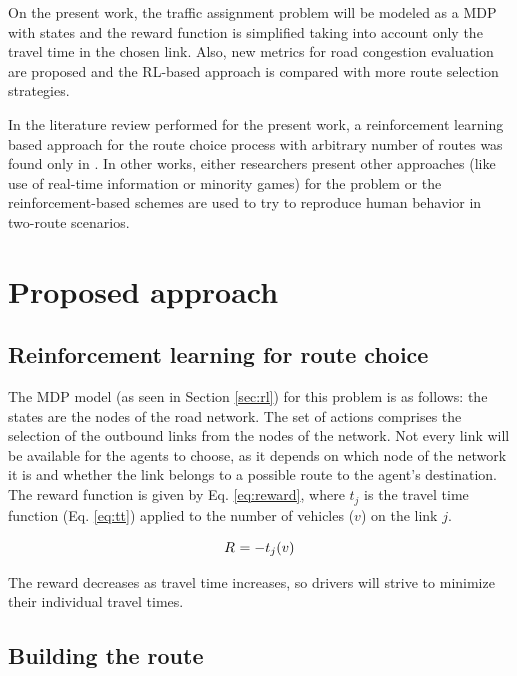 \documentclass{RITA}
\newcommand{\travTime}{\ensuremath{t_j}} 	%
\newcommand{\veh}{\ensuremath{v}}		%
\newcommand{\reward}[1][]{\ensuremath{R_#1}}	%
\begin{document}
On the present work, the traffic assignment problem will be modeled as a MDP with states and the reward function is simplified taking into account only the travel time in the chosen link. Also, new metrics for road congestion evaluation are proposed and the RL-based approach is compared with more route selection strategies. %

In the literature review performed for the present work, a reinforcement learning based approach for the route choice process with arbitrary number of routes was found only in \cite{Tavares&Bazzan2012}. In other works, either researchers present other approaches (like use of real-time information or minority games) for the problem or the reinforcement-based schemes are used to try to reproduce human behavior in two-route scenarios.

\section{Proposed approach}
\label{sec:proposal}

\subsection{Reinforcement learning for route choice}

The MDP model (as seen in Section \ref{sec:rl}) for this problem is as follows: the states are the nodes of the road network. The set of actions comprises the selection of the outbound links from the nodes of the network. Not every link will be available for the agents to choose, as it depends on which node of the network it is and whether the link belongs to a possible route to the agent's destination. The reward function is given by Eq. \eqref{eq:reward}, where $\travTime$ is the travel time function (Eq. \eqref{eq:tt}) applied to the number of vehicles ($\veh$) on the link $j$.

\begin{equation}
\label{eq:reward}
\reward{} = - \travTime(\veh)
\end{equation}

The reward decreases as travel time increases, so drivers will strive to minimize their individual travel times.

\subsection{Building the route}
\end{document}
